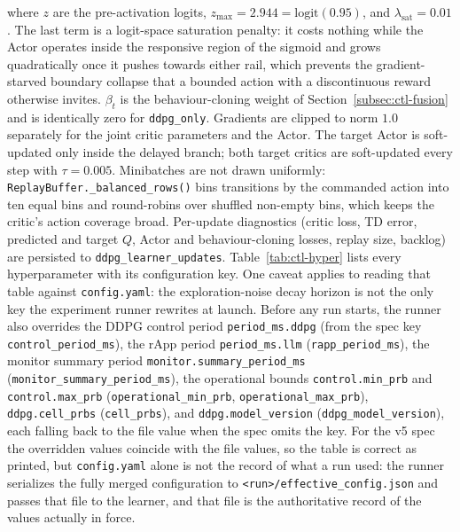 where $z$ are the pre-activation logits, $z_{\max}=2.944=\mathrm{logit}(0.95)$, and $\lambda_{\mathrm{sat}}=0.01$. The last term is a logit-space saturation penalty: it costs nothing while the Actor operates inside the responsive region of the sigmoid and grows quadratically once it pushes towards either rail, which prevents the gradient-starved boundary collapse that a bounded action with a discontinuous reward otherwise invites. $\beta_t$ is the behaviour-cloning weight of Section~\ref{subsec:ctl-fusion} and is identically zero for \texttt{ddpg\_only}. Gradients are clipped to norm $1.0$ separately for the joint critic parameters and the Actor. The target Actor is soft-updated only inside the delayed branch; both target critics are soft-updated every step with $\tau=0.005$. Minibatches are not drawn uniformly: \texttt{ReplayBuffer.\_balanced\_rows()} bins transitions by the commanded action into ten equal bins and round-robins over shuffled non-empty bins, which keeps the critic's action coverage broad. Per-update diagnostics (critic loss, TD error, predicted and target $Q$, Actor and behaviour-cloning losses, replay size, backlog) are persisted to \texttt{ddpg\_learner\_updates}. Table~\ref{tab:ctl-hyper} lists every hyperparameter with its configuration key. One caveat applies to reading that table against \texttt{config.yaml}: the exploration-noise decay horizon is not the only key the experiment runner rewrites at launch. Before any run starts, the runner also overrides the DDPG control period \texttt{period\_ms.ddpg} (from the spec key \texttt{control\_period\_ms}), the rApp period \texttt{period\_ms.llm} (\texttt{rapp\_period\_ms}), the monitor summary period \texttt{monitor.summary\_period\_ms} (\texttt{monitor\_summary\_period\_ms}), the operational bounds \texttt{control.min\_prb} and \texttt{control.max\_prb} (\texttt{operational\_min\_prb}, \texttt{operational\_max\_prb}), \texttt{ddpg.cell\_prbs} (\texttt{cell\_prbs}), and \texttt{ddpg.model\_version} (\texttt{ddpg\_model\_version}), each falling back to the file value when the spec omits the key. For the v5 spec the overridden values coincide with the file values, so the table is correct as printed, but \texttt{config.yaml} alone is not the record of what a run used: the runner serializes the fully merged configuration to \texttt{<run>/effective\_config.json} and passes that file to the learner, and that file is the authoritative record of the values actually in force.

